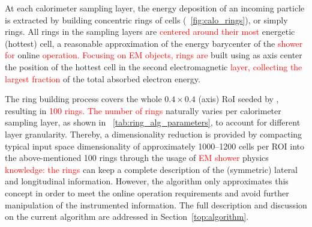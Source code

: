 At each calorimeter sampling layer, the energy deposition of an incoming particle is extracted by building concentric rings of cells (\figurename~\ref{fig:calo_rings}), or simply rings. All rings in the \ecal sampling layers are
\textcolor{red}{centered around their most} energetic (hottest) cell, a reasonable
approximation of the energy barycenter of the \textcolor{red}{shower for} online
\textcolor{red}{operation. Focusing on EM objects, rings are} built using as axis center the position of
the hottest cell in the second electromagnetic \textcolor{red}{layer, collecting the largest fraction} of the total absorbed electron energy.

The ring building process covers the whole $0.4\times0.4$ (\etaphi axis) RoI
seeded by \licalo, resulting in \textcolor{red}{100 rings. The number of rings}
naturally varies per calorimeter sampling layer, as shown in
\tablename~\ref{tab:ring_alg_parameters}, to account for different layer
granularity. Thereby, a dimensionality reduction is provided by compacting
typical input space dimensionality of approximately 1000--1200 cells per ROI into
the above-mentioned 100 rings through the usage of \textcolor{red}{EM shower} physics \textcolor{red}{knowledge: the rings} can keep a complete description of the (symmetric) lateral and
longitudinal information. However, the algorithm only approximates this concept
in order to meet the online operation requirements and avoid further
manipulation of the instrumented information. The full description and
discussion on the current algorithm are addressed in
Section~\ref{top:algorithm}.





